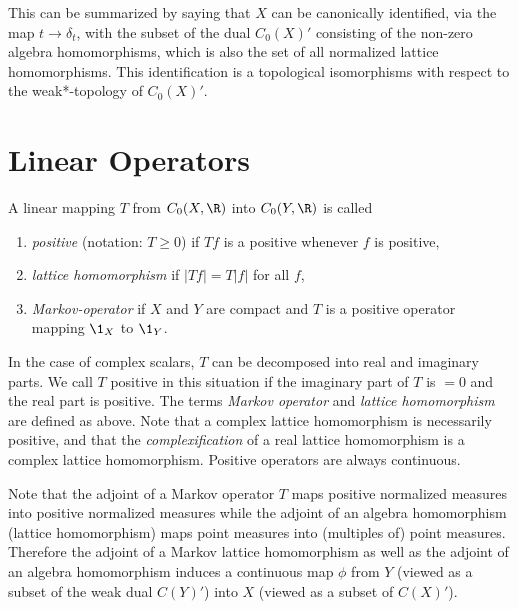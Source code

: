 This can be summarized by saying that $X$ can be canonically identified, via the map $t \to \delta_{t}$, with the subset of the dual $C_{0}(X)'$ consisting of the non-zero algebra homomorphisms, which is also the set of all normalized lattice homomorphisms.
This identification is a topological isomorphisms with respect to the weak*-topology of\/ $ C_{0}(X)' $.
\section{Linear Operators}\label{sec:b1-3}%
A linear mapping $T$ from $C_{0}(X,\R)$ into $C_{0}(Y,\R)$ is called
\begin{enumerate}[\upshape (i), labelindent=.25em]

\item
\emph{positive} (notation: $T \geq 0$)  if\/ $Tf$  is a positive whenever $ f $ is positive, 

\item
\emph{lattice homomorphism}  if\/ $|Tf| = T|f|$  for all $ f $,

\item
\emph{Markov-operator}  if  $ X $ and $ Y $ are compact and $ T $ is a positive operator mapping $\1_{X}$ to $\1_{Y}$.

\end{enumerate}
In the case of complex scalars, $T$ can be decomposed into real and imaginary parts.
We call $T$ positive in this situation if the imaginary part of\/ $T$ is $= 0$ and the real part is positive.
The terms \emph{Markov operator} and \emph{lattice homomorphism} are defined as above.
Note that a complex lattice homomorphism is necessarily positive, and that the \emph{complexification} of a real lattice homomorphism is a complex lattice homomorphism.
Positive operators are always continuous.

Note that the adjoint of a Markov operator $T$ maps positive normalized measures into positive normalized measures while the adjoint of an algebra homomorphism (lattice homomorphism) maps point measures into (multiples of) point measures.
Therefore the adjoint of a Markov lattice homomorphism as well as the adjoint of an algebra homomorphism induces a continuous map $\phi$ from $Y$ (viewed as a subset of the weak dual $C(Y)'$) into $X$ (viewed as a subset of\/ $C(X)'$).

